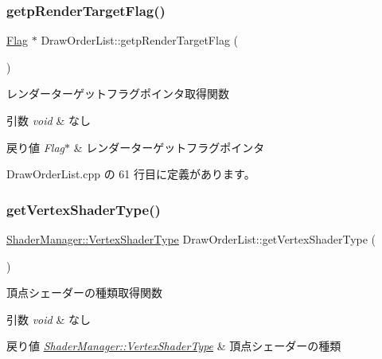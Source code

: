\subsubsection{\texorpdfstring{getp\+Render\+Target\+Flag()}{getpRenderTargetFlag()}}
{\footnotesize\ttfamily \mbox{\hyperlink{class_flag}{Flag}} $\ast$ Draw\+Order\+List\+::getp\+Render\+Target\+Flag (\begin{DoxyParamCaption}{ }\end{DoxyParamCaption})}



レンダーターゲットフラグポインタ取得関数 


\begin{DoxyParams}{引数}
{\em void} & なし \\
\hline
\end{DoxyParams}

\begin{DoxyRetVals}{戻り値}
{\em Flag$\ast$} & レンダーターゲットフラグポインタ \\
\hline
\end{DoxyRetVals}


 Draw\+Order\+List.\+cpp の 61 行目に定義があります。

\mbox{\label{class_draw_order_list_acf4c6c92ca4105bf6101a7c99e134aa1}} 
\subsubsection{\texorpdfstring{get\+Vertex\+Shader\+Type()}{getVertexShaderType()}}
{\footnotesize\ttfamily \mbox{\hyperlink{class_shader_manager_a9b51e49d70eb3cc58f6d1f3994e8cfbd}{Shader\+Manager\+::\+Vertex\+Shader\+Type}} Draw\+Order\+List\+::get\+Vertex\+Shader\+Type (\begin{DoxyParamCaption}{ }\end{DoxyParamCaption})}



頂点シェーダーの種類取得関数 


\begin{DoxyParams}{引数}
{\em void} & なし \\
\hline
\end{DoxyParams}

\begin{DoxyRetVals}{戻り値}
{\em \mbox{\hyperlink{class_shader_manager_a9b51e49d70eb3cc58f6d1f3994e8cfbd}{Shader\+Manager\+::\+Vertex\+Shader\+Type}}} & 頂点シェーダーの種類 \\
\hline
\end{DoxyRetVals}


